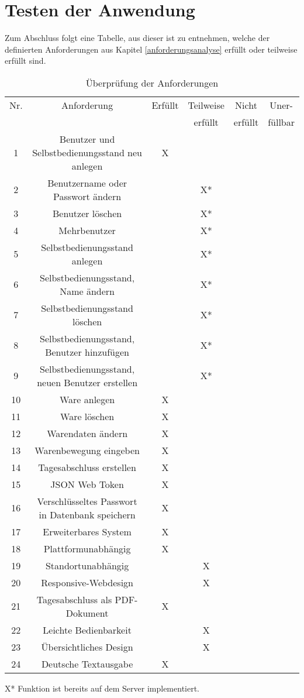 \section{Testen der Anwendung}\label{testen_der_Anwendung}

Zum Abschluss folgt eine Tabelle, aus dieser ist zu entnehmen, welche der definierten Anforderungen aus Kapitel \ref{anforderungsanalyse}
erfüllt oder teilweise erfüllt sind. 
\\
\begin{table}[htbp]
\begin{tabular}{|c|c|c|c|c|c|}
	\hline
		Nr. & Anforderung & Erfüllt &Teilweise &Nicht  & Uner-\\
		 &  &  &erfüllt & erfüllt & füllbar\\
		\hline
		1 & Benutzer und Selbstbedienungsstand neu anlegen & X & & &  \\
		\hline
		2 & Benutzername oder Passwort ändern &  & X* &  &\\
		\hline
		3 & Benutzer löschen &  & X*  & & \\
		\hline
		4 & Mehrbenutzer &  & X*  &  &\\
		\hline	
		5 & Selbstbedienungsstand anlegen &  & X* & & \\
		\hline
		6 & Selbstbedienungsstand, Name ändern &  & X*  &  &\\
		\hline
		7 & Selbstbedienungsstand löschen &  & X* & & \\
		\hline
		8 & Selbstbedienungsstand, Benutzer hinzufügen &  & X* & & \\
		\hline
		9 & Selbstbedienungsstand, neuen Benutzer erstellen &  & X*  & & \\
		\hline
		10 & Ware anlegen & X &  & & \\
		\hline
		11 &  Ware löschen & X &  & & \\
		\hline
		12 &  Warendaten ändern & X &  & & \\
		\hline
		13 & Warenbewegung eingeben & X &  &  &\\
		\hline
		14 & Tagesabschluss erstellen & X &  &  &\\
		\hline
		15 & JSON Web Token  & X &  & & \\
		\hline
		16 &  Verschlüsseltes Passwort in Datenbank speichern & X &  & & \\
		\hline
		17 & Erweiterbares System & X &  & & \\
		\hline
		18 &  Plattformunabhängig & X &  &  & \\
		\hline
		19 &  Standortunabhängig &  & X & & \\
		\hline
		20 & Responsive-Webdesign &  & X &  & \\
		\hline
		21 &  Tagesabschluss als PDF-Dokument & X &  & & \\
		\hline
		22 & Leichte Bedienbarkeit &  & X & & \\
		\hline
		23 &  Übersichtliches Design &  & X &  &\\
		\hline
		24 &  Deutsche Textausgabe & X  &  & & \\
		\hline
	\end{tabular}
	X* Funktion ist bereits auf dem Server implementiert.
	\caption{Überprüfung der Anforderungen}
	\label{tab:zu2}
\end{table}

